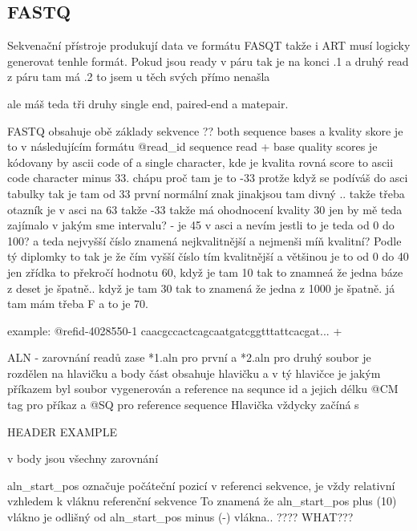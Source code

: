 \documentclass[czech,DP]{thesiskiv}
\begin{document}
\subsection{FASTQ}
Sekvenační přístroje produkují data ve formátu FASQT takže i ART musí logicky generovat tenhle formát.
Pokud jsou ready v páru tak je na konci .1
a druhý read z páru tam má .2 to jsem u těch svých přímo nenašla 

ale máš teda tři druhy single end, paired-end a matepair. 

FASTQ obsahuje obě základy sekvence ?? both sequence bases a kvality skore je to v následujícím formátu
@read\_id
sequence read
+
base quality scores je kódovany by ascii code of a single character, kde je kvalita rovná score to ascii code character minus 33. chápu proč tam je to -33 protže když se podíváš do asci tabulky tak je tam od 33 první normální znak jinakjsou tam divný .. 
takže třeba otazník je v asci na 63 takže -33 takže má ohodnocení kvality 30
jen by mě teda zajímalo v jakým sme intervalu? - je 45 v asci a nevím jestli to je teda od 0 do 100?  a teda nejvyšší číslo znamená nejkvalitnější a nejmenši míň kvalitní? Podle tý diplomky to tak je že čím vyšší číslo tím kvalitnější a většinou je to od 0 do 40 jen zřídka to překročí hodnotu 60, když je tam 10 tak to znamneá že jedna báze z deset je špatně.. když je tam 30 tak to znamená že jedna z 1000 je špatně.
já tam mám třeba F a to je 70.

example:
		@refid-4028550-1 
		caacgccactcagcaatgatcggtttattcacgat...
		+ 

ALN - zarovnání readů
zase *1.aln pro první a *2.aln pro druhý
soubor je rozdělen na hlavičku a body část
obsahuje hlavičku a v tý hlavičce je jakým příkazem byl soubor vygenerován a reference na sequnce id a jejich délku
@CM tag pro příkaz a
@SQ pro reference sequence
Hlavička vždycky začíná s 

		HEADER EXAMPLE

		
v body jsou všechny zarovnání 
	    
	    aln\_start\_pos označuje počáteční pozicí v referenci sekvence, je vždy relativní vzhledem k vláknu referenční sekvence
	    To znamená že aln\_start\_pos plus (10) vlákno je odlišný od  aln\_start\_pos minus (-) vlákna.. ???? WHAT???
	    
\end{document}
